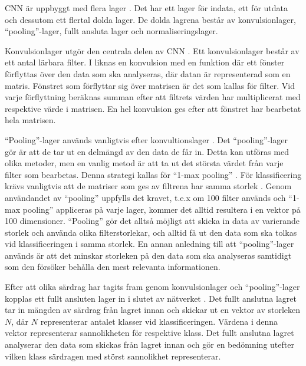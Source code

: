 \documentclass{kaumasters} %
\begin{document}
CNN är uppbyggt med flera lager \cite{cnn:005}. Det har ett lager för indata, ett för utdata och dessutom ett flertal dolda lager. De dolda lagrena består av konvulsionlager, “pooling”-lager, fullt ansluta lager och normaliseringslager. 

Konvulsionlager utgör den centrala delen av CNN \cite{cnn:005}. Ett konvulsionlager består av ett antal lärbara filter. I \cite{cnn:004} liknas en konvulsion med en funktion där ett fönster förflyttas över den data som ska analyseras, där datan är representerad som en matris. Fönstret som förflyttar sig över matrisen är det som kallas för filter. Vid varje förflyttning beräknas summan efter att filtrets värden har multiplicerat med respektive värde i matrisen. En hel konvulsion ges efter att fönstret har bearbetat hela matrisen.

“Pooling”-lager används vanligtvis efter konvultionslager \cite{cnn:004}. Det “pooling”-lager gör är att de tar ut en delmängd av den data de får in. Detta kan utföras med olika metoder, men en vanlig metod är att ta ut det största värdet från varje filter som bearbetas. Denna strategi kallas för “1-max pooling” \cite{cnn:002}. För klassificering krävs vanligtvis att de matriser som ges av filtrena har samma storlek \cite{cnn:004}. Genom användandet av “pooling” uppfylls det kravet, t.e.x om 100 filter används och “1-max pooling” appliceras på varje lager, kommer det alltid resultera i en vektor på 100 dimensioner. “Pooling” gör det alltså möjligt att skicka in data av varierande storlek och använda olika filterstorlekar, och alltid få ut den data som ska tolkas vid klassificeringen i samma storlek. En annan anledning till att “pooling”-lager används är att det minskar storleken på den data som ska analyseras samtidigt som den försöker behålla den mest relevanta informationen.

Efter att olika särdrag har tagits fram genom konvulsionlager och “pooling”-lager kopplas ett fullt ansluten lager in i slutet av nätverket \cite{cnn:008}. Det fullt anslutna lagret tar in mängden av särdrag från lagret innan och skickar ut en vektor av storleken $N$, där $N$ representerar antalet klasser vid klassificeringen. Värdena i denna vektor representerar sannolikheten för respektive klass. Det fullt anslutna lagret analyserar den data som skickas från lagret innan och gör en bedömning utefter vilken klass särdragen med störst sannolikhet representerar. 
\end{document}
